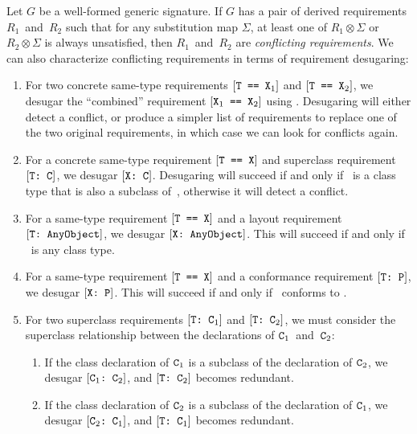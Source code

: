 \documentclass[../generics]{subfiles}
\begin{document}
\begin{definition}\label{conflicting req def}
Let $G$ be a well-formed generic signature. If $G$ has a pair of derived requirements $R_1$~and~$R_2$ such that for any substitution map $\Sigma$, at least one of $R_1\otimes\Sigma$ or $R_2\otimes\Sigma$ is always unsatisfied, then $R_1$~and~$R_2$ are \emph{conflicting requirements}. We can also characterize conflicting requirements in terms of requirement desugaring:
\begin{enumerate}
\item For two concrete same-type requirements $[\texttt{T == $\texttt{X}_1$}]$ and $[\texttt{T == $\texttt{X}_2$}]$, we desugar the ``combined'' requirement $[\texttt{$\texttt{X}_1$ == $\texttt{X}_2$}]$ using . Desugaring will either detect a conflict, or produce a simpler list of requirements to replace one of the two original requirements, in which case we can look for conflicts again.
\item For a concrete same-type requirement $[\texttt{T == X}]$ and superclass requirement $[\texttt{T:~C}]$, we desugar $[\texttt{X:~C}]$. Desugaring will succeed if and only if \tX~is a class type that is also a subclass of~\tC, otherwise it will detect a conflict.
\item For a same-type requirement $[\texttt{T == X}]$ and a layout requirement $[\texttt{T:~AnyObject}]$, we desugar $[\texttt{X:~AnyObject}]$. This will succeed if and only if \tX~is any class type.
\item For a same-type requirement $[\texttt{T == X}]$ and a conformance requirement $[\texttt{T:~P}]$, we desugar $[\texttt{X:~P}]$. This will succeed if and only if \tX\ conforms to \tP.
\item For two superclass requirements $[\texttt{T:~$\texttt{C}_1$}]$ and $[\texttt{T:~$\texttt{C}_2$}]$, we must consider the superclass relationship between the declarations of $\texttt{C}_1$~and~$\texttt{C}_2$:
\begin{enumerate}
\item If the class declaration of $\texttt{C}_1$ is a subclass of the declaration of $\texttt{C}_2$, we desugar $[\texttt{$\texttt{C}_1$:~$\texttt{C}_2$}]$, and $[\texttt{T:~$\texttt{C}_2$}]$ becomes redundant.
\item If the class declaration of $\texttt{C}_2$ is a subclass of the declaration of $\texttt{C}_1$, we desugar $[\texttt{$\texttt{C}_2$:~$\texttt{C}_1$}]$, and $[\texttt{T:~$\texttt{C}_1$}]$ becomes redundant.

\end{enumerate}
\end{enumerate}
\end{definition}
\end{document}
